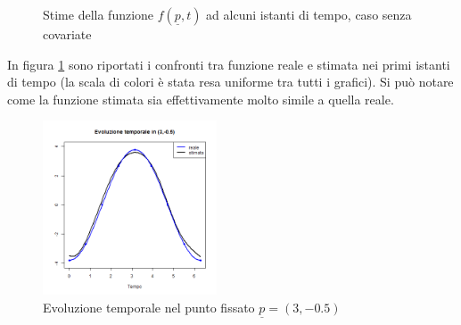 \documentclass[a4paper,11pt,twoside,openright]{book}							%
\begin{document}
\begin{figure}[p]
{   }
\caption{Stime della funzione $f(\underline p,t)$ ad alcuni istanti di tempo, caso senza covariate}
\label{fig:DomC_ris}

\end{figure}

In figura \ref{fig:DomC_ris} sono riportati i confronti tra funzione reale e stimata nei primi istanti di tempo (la scala di colori è stata resa uniforme tra tutti i grafici). Si può notare come la funzione stimata sia effettivamente molto simile a quella reale.
\begin{figure}[h]
\centering
\includegraphics[width=0.46\textwidth]{Immagini/DomC_tfissato.png}   
\caption{Evoluzione temporale nel punto fissato $\underline p=(3,-0.5)$}
\label{fig:DomC_ris2}
\end{figure}
\end{document}
